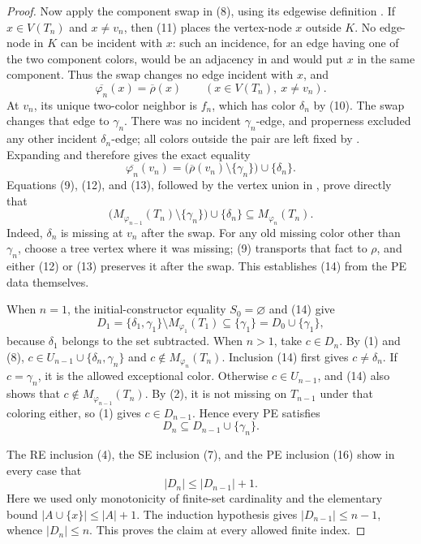 \begin{proof}
Now apply the component swap in (8), using its edgewise definition
.  If \(x\in V(T_n)\) and \(x\ne v_n\),
then (11) places the vertex-node \(x\) outside \(K\).  No edge-node in
\(K\) can be incident with \(x\): such an incidence, for an edge having
one of the two component colors, would be an adjacency in
 and would put \(x\) in the same
component.  Thus the swap changes no edge incident with \(x\), and
\[
 \overline{\varphi_n}(x)=\overline\rho(x)\qquad
 (x\in V(T_n),\ x\ne v_n).                                    \tag{12}
\]
At \(v_n\), its unique two-color neighbor is \(f_n\), which has color
\(\delta_n\) by (10).  The swap changes that edge to
\(\gamma_n\).  There was no incident \(\gamma_n\)-edge, and properness
excluded any other incident \(\delta_n\)-edge; all colors outside the
pair are left fixed by .  Expanding
 and  therefore gives the
exact equality
\[
 \overline{\varphi_n}(v_n)
   =\bigl(\overline\rho(v_n)\setminus\{\gamma_n\}\bigr)
       \cup\{\delta_n\}.                                      \tag{13}
\]
Equations (9), (12), and (13), followed by the vertex union in
, prove directly that
\[
 \bigl(M_{\varphi_{n-1}}(T_n)\setminus\{\gamma_n\}\bigr)
       \cup\{\delta_n\}
 \subseteq M_{\varphi_n}(T_n).                                 \tag{14}
\]
Indeed, \(\delta_n\) is missing at \(v_n\) after the swap.  For any old
missing color other than \(\gamma_n\), choose a tree vertex where it was
missing; (9) transports that fact to \(\rho\), and either (12) or (13)
preserves it after the swap.  This establishes (14) from the PE data
themselves.

When \(n=1\), the initial-constructor equality \(S_0=\varnothing\) and
(14) give
\[
 D_1=\{\delta_1,\gamma_1\}\setminus M_{\varphi_1}(T_1)
     \subseteq\{\gamma_1\}=D_0\cup\{\gamma_1\},                \tag{15}
\]
because \(\delta_1\) belongs to the set subtracted.  When \(n>1\), take
\(c\in D_n\).  By (1) and (8),
\(c\in U_{n-1}\cup\{\delta_n,\gamma_n\}\) and
\(c\notin M_{\varphi_n}(T_n)\).  Inclusion (14) first gives
\(c\ne\delta_n\).  If \(c=\gamma_n\), it is the allowed exceptional
color.  Otherwise \(c\in U_{n-1}\), and (14) also shows that
\(c\notin M_{\varphi_{n-1}}(T_n)\).  By (2), it is not missing on
\(T_{n-1}\) under that coloring either, so (1) gives
\(c\in D_{n-1}\).  Hence every PE satisfies
\[
 D_n\subseteq D_{n-1}\cup\{\gamma_n\}.                         \tag{16}
\]

The RE inclusion (4), the SE inclusion (7), and the PE inclusion (16)
show in every case that
\[
 |D_n|\leq |D_{n-1}|+1.
\]
Here we used only monotonicity of finite-set cardinality and the elementary
bound \(|A\cup\{x\}|\leq |A|+1\).  The induction hypothesis gives
\(|D_{n-1}|\leq n-1\), whence \(|D_n|\leq n\).  This proves the claim at
every allowed finite index.
\end{proof}
